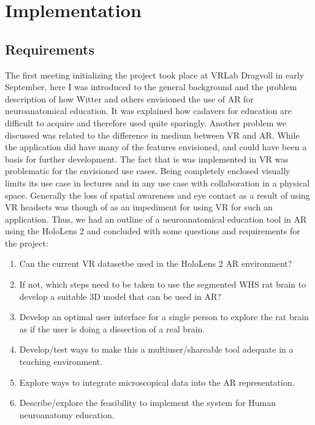 


\chapter{Implementation}


\section{Requirements}\label{chap:req}

%
%


The first meeting initializing the project took place at VRLab Dragvoll in early September, here I was introduced to the general background and the problem description of how Witter and others envisioned the use of AR for neuroanatomical education. It was explained how cadavers for education are difficult to acquire and therefore used quite sparingly. 
Another problem we discussed was related to the difference in medium between VR and AR. While the application  did have many of the features envisioned, and could have been a basis for further development. The fact that is was implemented in VR was problematic for the envisioned use cases. Being completely enclosed visually limits its use case in lectures and in any use case with collaboration in a physical space. Generally the loss of spatial awareness and eye contact as a result of using VR headsets was though of as an impediment for using VR for such an application. 
Thus, we had an outline of a neuroanatomical education tool in AR using the HoloLens 2 and concluded with some questions and requirements for the project:

\begin{enumerate}\label{mennoslist}
    \item Can the current VR dataset\footnotemark be used in the HoloLens 2 AR environment?
    \item If not, which steps need to be taken to use the segmented WHS rat brain to develop a suitable 3D model that can be used in AR?
    \item Develop an optimal user interface for a single person to explore the rat brain as if the user is doing a dissection of a real brain.
    \item Develop/test ways to make this a multiuser/shareable tool adequate in a teaching environment.
    \item Explore ways to integrate microscopical data into the AR representation.
    \item Describe/explore the feasibility to implement the system for Human neuroanatomy education.
\end{enumerate}

